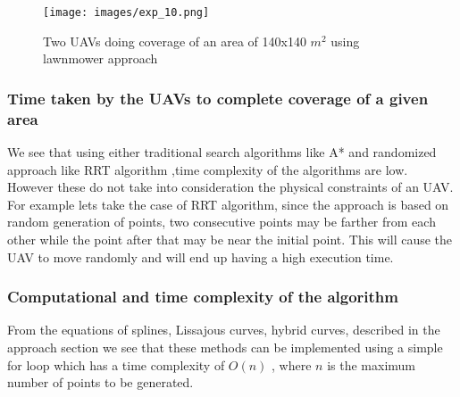 \begin{figure}[htbp]

  \texttt{[image: images/exp\_10.png]}
  \caption{Two UAVs doing coverage of an area of 140x140 $m^{2}$ using lawnmower approach}\label{fig:dualimg7676} 

\end{figure}


\subsubsection{Time taken by the UAVs to complete coverage of a given area}
We see that using either traditional search algorithms like A* \cite{9} and randomized approach like 
RRT algorithm \cite{16},time complexity of the algorithms are low. However these do not take into consideration the physical constraints of an UAV. For example lets take the case of RRT algorithm, since the approach is based on random generation of points, two consecutive points may be farther from each other while the point after that may be near the initial point. This will cause the UAV to move randomly and will end up having a high execution time.
\subsubsection{Computational and time complexity of the algorithm}
From the equations of splines, Lissajous curves, hybrid curves, described in the approach section we see that these methods can be implemented using a simple for loop which has a time complexity of $O(n)$ \cite{17}, where $n$ is the maximum number of points to be generated.

